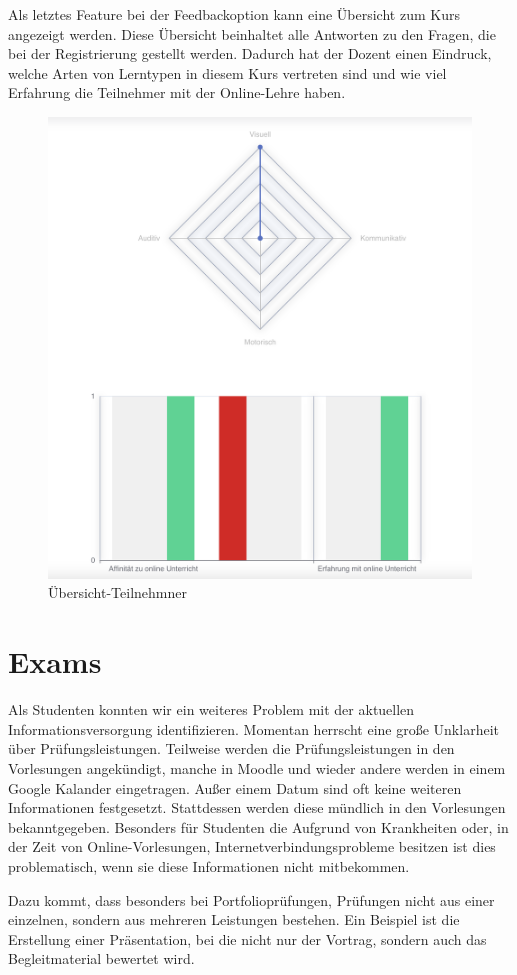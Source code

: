 Als letztes Feature bei der Feedbackoption kann eine Übersicht zum Kurs angezeigt werden. Diese Übersicht beinhaltet alle Antworten zu den Fragen, die 
bei der Registrierung gestellt werden. Dadurch hat der Dozent einen Eindruck, welche Arten von Lerntypen in diesem Kurs vertreten sind und wie viel 
Erfahrung die Teilnehmer mit der Online-Lehre haben. 
\begin{figure}[!h] 
    \centering
    \includegraphics[width=.7\textwidth]{img/Feedback_uebersicht_Teilnehmer.png}
    \caption{Übersicht-Teilnehmner}
    \label{fig:uebersichtTeilnehmner}
\end{figure}

\section{Exams}
Als Studenten konnten wir ein weiteres Problem mit der aktuellen Informationsversorgung identifizieren.
Momentan herrscht eine große Unklarheit über Prüfungsleistungen.
Teilweise werden die Prüfungsleistungen in den Vorlesungen angekündigt, manche in Moodle und wieder andere werden in einem Google Kalander eingetragen.
Außer einem Datum sind oft keine weiteren Informationen festgesetzt.
Stattdessen werden diese mündlich in den Vorlesungen bekanntgegeben.
Besonders für Studenten die Aufgrund von Krankheiten oder, in der Zeit von Online-Vorlesungen, Internetverbindungsprobleme besitzen ist dies problematisch, wenn sie diese Informationen nicht mitbekommen.

Dazu kommt, dass besonders bei Portfolioprüfungen, Prüfungen nicht aus einer einzelnen, sondern aus mehreren Leistungen bestehen.
Ein Beispiel ist die Erstellung einer Präsentation, bei die nicht nur der Vortrag, sondern auch das Begleitmaterial bewertet wird.

